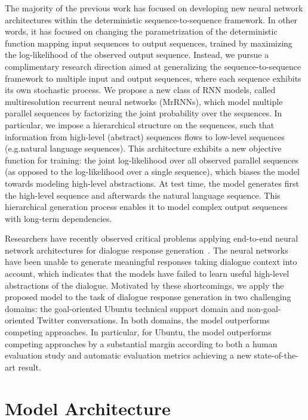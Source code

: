\documentclass{article}
\begin{document}
The majority of the previous work has focused on developing new neural network architectures within the deterministic sequence-to-sequence framework. In other words, it has focused on changing the parametrization of the deterministic function mapping input sequences to output sequences, trained by maximizing the log-likelihood of the observed output sequence.
Instead, we pursue a complimentary research direction aimed at generalizing the sequence-to-sequence framework to multiple input and output sequences, where each sequence exhibits its own stochastic process.
We propose a new class of RNN models, called multiresolution recurrent neural networks (MrRNNs), which model multiple parallel sequences by factorizing the joint probability over the sequences.
In particular, we impose a hierarchical structure on the sequences, such that information from high-level (abstract) sequences flows to low-level sequences (e.g.\@ natural language sequences).
This architecture exhibits a new objective function for training:
the joint log-likelihood over all observed parallel sequences (as opposed to the log-likelihood over a single sequence), which biases the model towards modeling high-level abstractions.
At test time, the model generates first the high-level sequence and afterwards the natural language sequence.
This hierarchical generation process enables it to model complex output sequences with long-term dependencies.


Researchers have recently observed critical problems applying end-to-end neural network architectures for dialogue response generation~\cite{DBLP:conf/aaai/SerbanSBCP16,li2015diversity}.
The neural networks have been unable to generate meaningful responses taking dialogue context into account,
which indicates that the models have failed to learn useful high-level abstractions of the dialogue.
Motivated by these shortcomings,
we apply the proposed model to the task of dialogue response generation in two challenging domains:
the goal-oriented Ubuntu technical support domain and non-goal-oriented Twitter conversations.
In both domains, the model outperforms competing approaches.
In particular, for Ubuntu, the model outperforms competing approaches by a substantial margin according to both a human evaluation study and automatic evaluation metrics achieving a new state-of-the-art result.





%
 
\section{Model Architecture}
\end{document}
